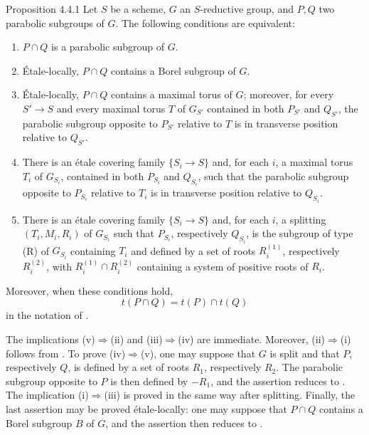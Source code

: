 
\begin{sgastatement}{Proposition 4.4.1}
Let \(S\) be a scheme, \(G\) an \(S\)-reductive group, and \(P,Q\)
two parabolic subgroups of \(G\).  The following conditions are
equivalent:
\begin{enumerate}[label=\textup{(\roman*)}]
\item \(P\cap Q\) is a parabolic subgroup of \(G\).
\item Étale-locally, \(P\cap Q\) contains a Borel subgroup of \(G\).
\item Étale-locally, \(P\cap Q\) contains a maximal torus of \(G\);
moreover, for every \(S'\to S\) and every maximal torus \(T\) of
\(G_{S'}\) contained in both \(P_{S'}\) and \(Q_{S'}\), the parabolic
subgroup opposite to \(P_{S'}\) relative to \(T\) is in transverse
position relative to \(Q_{S'}\).
\item There is an étale covering family \(\{S_i\to S\}\) and, for
each \(i\), a maximal torus \(T_i\) of \(G_{S_i}\), contained in both
\(P_{S_i}\) and \(Q_{S_i}\), such that the parabolic subgroup opposite
to \(P_{S_i}\) relative to \(T_i\) is in transverse position relative
to \(Q_{S_i}\).
\item There is an étale covering family \(\{S_i\to S\}\) and, for
each \(i\), a splitting \((T_i,M_i,R_i)\) of \(G_{S_i}\) such that
\(P_{S_i}\), respectively \(Q_{S_i}\), is the subgroup of type
\textup{(R)} of \(G_{S_i}\) containing \(T_i\) and defined by a set
of roots \(R_i^{(1)}\), respectively \(R_i^{(2)}\), with
\(R_i^{(1)}\cap R_i^{(2)}\) containing a system of positive roots
of \(R_i\).
\end{enumerate}
Moreover, when these conditions hold,
\[
 t(P\cap Q)=t(P)\cap t(Q)
\]
in the notation of .
\end{sgastatement}

The implications \textup{(v)}\(\Rightarrow\)\textup{(ii)} and
\textup{(iii)}\(\Rightarrow\)\textup{(iv)} are immediate.  Moreover,
\textup{(ii)}\(\Rightarrow\)\textup{(i)} follows from .  To prove
\textup{(iv)}\(\Rightarrow\)\textup{(v)}, one may suppose that \(G\)
is split and that \(P\), respectively \(Q\), is defined by a set of
roots \(R_1\), respectively \(R_2\).  The parabolic subgroup opposite
to \(P\) is then defined by \(-R_1\), and the assertion reduces to
.  The implication
\textup{(i)}\(\Rightarrow\)\textup{(iii)} is proved in the same way
after splitting.  Finally, the last assertion may be proved
étale-locally: one may suppose that \(P\cap Q\) contains a Borel
subgroup \(B\) of \(G\), and the assertion then reduces to .


